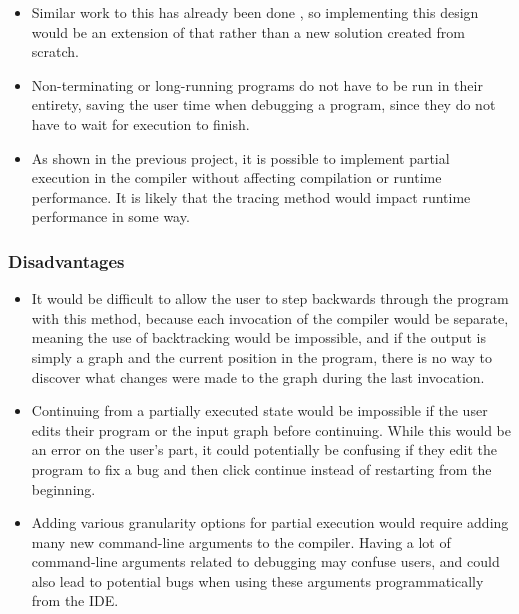\documentclass[authoryearcitations]{UoYCSproject}
\begin{document}
\begin{itemize}
    \item Similar work to this has already been done \citep{taylor2016}, so
          implementing this design would be an extension of that rather than a
          new solution created from scratch.

    \item Non-terminating or long-running programs do not have to be run in their
          entirety, saving the user time when debugging a program, since they do
          not have to wait for execution to finish.

    \item As shown in the previous project, it is possible to implement partial
          execution in the compiler without affecting compilation or runtime
          performance. It is likely that the tracing method would impact runtime
          performance in some way.
\end{itemize}


\subsubsection{Disadvantages}
\label{sec:ProposedDesign1Disadvantages}

\begin{itemize}
    \item It would be difficult to allow the user to step backwards through the
          program with this method, because each invocation of the compiler
          would be separate, meaning the use of backtracking would be impossible,
          and if the output is simply a graph and the current position in the
          program, there is no way to discover what changes were made to the graph
          during the last invocation.

    \item Continuing from a partially executed state would be impossible if the
          user edits their program or the input graph before continuing. While
          this would be an error on the user's part, it could potentially be
          confusing if they edit the program to fix a bug and then click continue
          instead of restarting from the beginning.

    \item Adding various granularity options for partial execution would require
          adding many new command-line arguments to the compiler. Having a lot
          of command-line arguments related to debugging may confuse users, and
          could also lead to potential bugs when using these arguments
          programmatically from the IDE.
\end{itemize}
\end{document}
